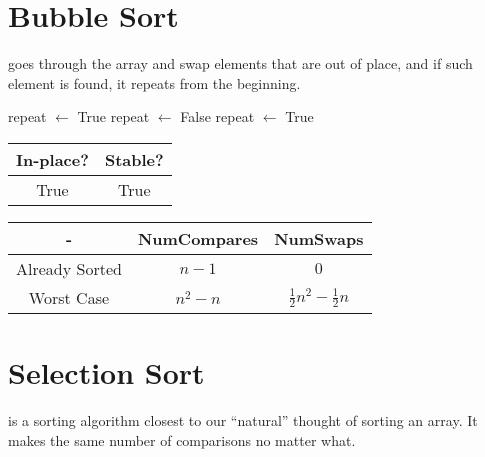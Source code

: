 \documentclass{report}
\begin{document}
\section{Bubble Sort}

 goes through the array and swap elements that are out of place, and if such element is found, it repeats from the beginning.

\begin{algorithm}
    \begin{algorithmic}[0]
       
        \State repeat $\gets$ True
          \State repeat $\gets$ False
            \State {} 
              \State repeat $\gets$ True
            \EndIf
          \EndFor
        \EndWhile
      \EndProcedure
    \end{algorithmic}
\end{algorithm}

\begin{center}
  \begin{tabular}{ | c | c | }
    \hline
    In-place? & Stable? \\
    \hline
    True & True \\
    \hline
  \end{tabular}
\end{center}

\begin{center}
  \begin{tabular}{ | c | c | c | }
    \hline
    - & NumCompares & NumSwaps \\
    \hline
    Already Sorted & $n - 1$ & $0$ \\
    \hline
    Worst Case & $n^{2} - n$ & $\frac{1}{2} n^{2} - \frac{1}{2} n$ \\
    \hline
  \end{tabular}
\end{center}

\section{Selection Sort}

 is a sorting algorithm closest to our ``natural'' thought of sorting an array. It makes the same number of comparisons no matter what.
\end{document}
